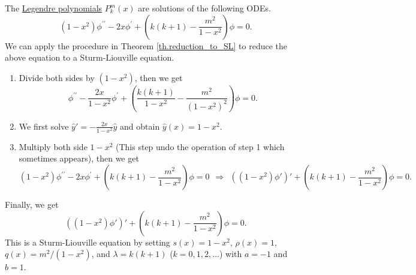 \begin{example} The \underline{Legendre polynomials} $P_k^m(x)$ are solutions of the following ODEs.
    \begin{equation}\label{eq.Legendre}
        (1-x^2) \phi^{\prime \prime}-2 x \phi^{\prime}+\left(k(k+1)-\frac{m^2}{1-x^2}\right) \phi=0.
    \end{equation}
    We can apply the procedure in Theorem \ref{th.reduction_to_SL} to reduce the above equation to a Sturm-Liouville equation.
    
    \begin{enumerate}
        \item Divide both sides by $(1-x^2)$, then we get
        \begin{equation}\label{eq.ex_Legendre_1}
            \phi^{\prime \prime}-\frac{2x}{1-x^2} \phi^{\prime}+\left(\frac{k(k+1)}{1-x^2}-\frac{m^2}{(1-x^2)^2}\right) \phi=0 .
        \end{equation}
        \item We first solve $\widehat{y}' = -\frac{2x}{1-x^2}\widehat{y}$ and obtain $\widehat{y}(x) = 1-x^2$.
        \item Multiply both side $1-x^2$ (This step undo the operation of step 1 which sometimes appears), then we get 
        \begin{equation}
            (1-x^2) \phi^{\prime \prime}-2 x \phi^{\prime}+\left(k(k+1)-\frac{m^2}{1-x^2}\right) \phi=0  \ \  \Rightarrow\ \ ((1-x^2) \phi')'+\left(k(k+1)-\frac{m^2}{1-x^2}\right) \phi=0 .
        \end{equation}
    \end{enumerate}
Finally, we get
\begin{equation}\label{eq.Legendre_SL}
    ((1-x^2) \phi')'+\left(k(k+1)-\frac{m^2}{1-x^2}\right) \phi=0.
\end{equation}
This is a Sturm-Liouville equation by setting $s(x)=1-x^2$, $\rho(x)=1$, $q(x)=m^2 / (1-x^2)$, and $\lambda=k(k+1)$ ($k=0,1,2, \ldots$) with $a=-1$ and $b=1$.
\end{example}

